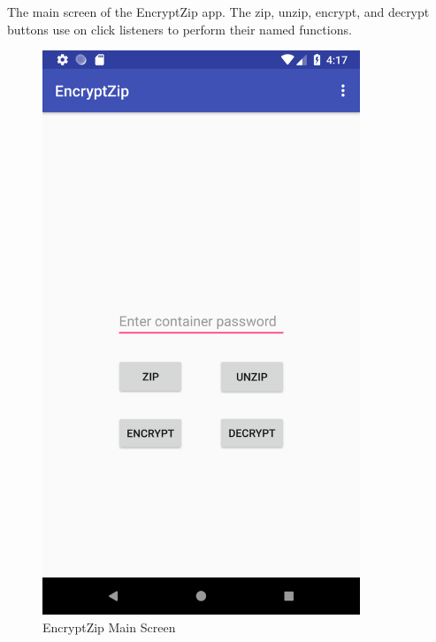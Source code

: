 \documentclass[10pt,a4paper]{article}
\begin{document}
The main screen of the EncryptZip app. The zip, unzip, encrypt, and decrypt buttons use on click listeners to perform their named functions.

\begin{figure}[H]
\centering
\includegraphics[width=9.5cm]{main1}
\caption{EncryptZip Main Screen}
\end{figure}

\clearpage
\end{document}
